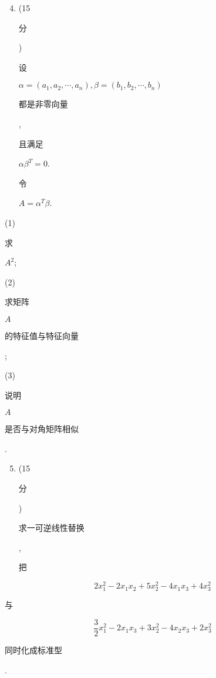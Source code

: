 \documentclass[10pt]{article}
\begin{document}
\begin{enumerate}
  \setcounter{enumi}{3}
  \item (15 \begin{CJK}{UTF8}{mj}分\end{CJK}) \begin{CJK}{UTF8}{mj}设\end{CJK} $\alpha=\left(a_{1}, a_{2}, \cdots, a_{n}\right), \beta=\left(b_{1}, b_{2}, \cdots, b_{n}\right)$ \begin{CJK}{UTF8}{mj}都是非零向量\end{CJK}, \begin{CJK}{UTF8}{mj}且满足\end{CJK} $\alpha \beta^{T}=0$. \begin{CJK}{UTF8}{mj}令\end{CJK} $A=\alpha^{T} \beta$.
\end{enumerate}
(1) \begin{CJK}{UTF8}{mj}求\end{CJK} $A^{2}$;

(2) \begin{CJK}{UTF8}{mj}求矩阵\end{CJK} $A$ \begin{CJK}{UTF8}{mj}的特征值与特征向量\end{CJK};

(3) \begin{CJK}{UTF8}{mj}说明\end{CJK} $A$ \begin{CJK}{UTF8}{mj}是否与对角矩阵相似\end{CJK}.

\begin{enumerate}
  \setcounter{enumi}{4}
  \item (15 \begin{CJK}{UTF8}{mj}分\end{CJK}) \begin{CJK}{UTF8}{mj}求一可逆线性替换\end{CJK}, \begin{CJK}{UTF8}{mj}把\end{CJK}
\end{enumerate}
$$
2 x_{1}^{2}-2 x_{1} x_{2}+5 x_{2}^{2}-4 x_{1} x_{3}+4 x_{3}^{2}
$$
\begin{CJK}{UTF8}{mj}与\end{CJK}
$$
\frac{3}{2} x_{1}^{2}-2 x_{1} x_{3}+3 x_{2}^{2}-4 x_{2} x_{3}+2 x_{3}^{2}
$$
\begin{CJK}{UTF8}{mj}同时化成标准型\end{CJK}.
\end{document}

